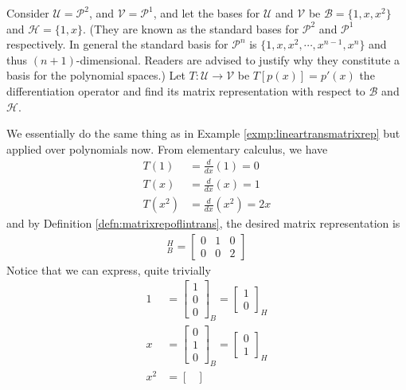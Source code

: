 \begin{exmp}
\label{exmp:lineartransderivative}
Consider $\mathcal{U} = \mathcal{P}^2$, and $\mathcal{V} = \mathcal{P}^1$, and let the bases for $\mathcal{U}$ and $\mathcal{V}$ be $\mathcal{B} = \{1, x, x^2\}$ and $\mathcal{H} = \{1, x\}$. (They are known as the standard bases for $\mathcal{P}^2$ and $\mathcal{P}^1$ respectively. In general the standard basis for $\mathcal{P}^n$ is $\{1, x, x^2, \cdots, x^{n-1}, x^n\}$ and thus $(n+1)$-dimensional. Readers are advised to justify why they constitute a basis for the polynomial spaces.) Let $T: \mathcal{U} \to \mathcal{V}$ be $T[p(x)] = p'(x)$ the differentiation operator and find its matrix representation with respect to $\mathcal{B}$ and $\mathcal{H}$.
\end{exmp}
\begin{solution}
We essentially do the same thing as in Example \ref{exmp:lineartransmatrixrep} but applied over polynomials now. From elementary calculus, we have
\begin{align*}
T(1) &= \frac{d}{dx}(1) = 0 \\
T(x) &= \frac{d}{dx}(x) = 1 \\
T(x^2) &= \frac{d}{dx}(x^2) = 2x
\end{align*}
and by Definition \ref{defn:matrixrepoflintrans}, the desired matrix representation is
\begin{align*}
[T]_B^H = 
\begin{bmatrix}
0 & 1 & 0 \\
0 & 0 & 2
\end{bmatrix}
\end{align*}
Notice that we can express, quite trivially
\begin{align*}
1 &= \begin{bmatrix}
1 \\
0 \\
0
\end{bmatrix}_B
=
\begin{bmatrix}
1 \\
0
\end{bmatrix}_H \\
x &= \begin{bmatrix}
0 \\
1 \\
0
\end{bmatrix}_B
=
\begin{bmatrix}
0 \\
1
\end{bmatrix}_H \\
x^2 &= \begin{bmatrix}

\end{bmatrix}
\end{align*}
\end{solution}
